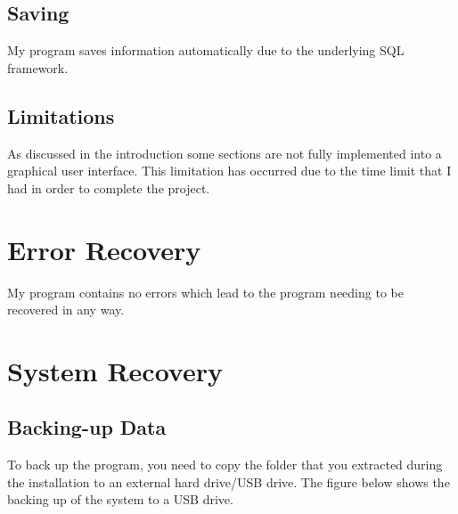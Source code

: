\subsection{Saving}

My program saves information automatically due to the underlying SQL framework.

\subsection{Limitations}

As discussed in the introduction some sections are not fully implemented into a graphical user interface. This limitation has occurred due to the time limit that I had in order to complete the project.





\section{Error Recovery} %

My program contains no errors which lead to the program needing to be recovered in any way.




\section{System Recovery}

\subsection{Backing-up Data} %

To back up the program, you need to copy the folder that you extracted during the installation to an external hard drive/USB drive. The figure below shows the backing up of the system to a USB drive.

